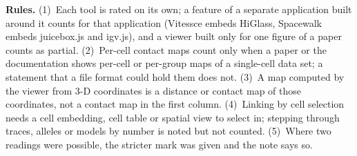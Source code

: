 \medskip\noindent\textbf{Rules.}
(1)~Each tool is rated on its own; a feature of a separate application built around it counts for that application (Vitessce embeds HiGlass, Spacewalk embeds juicebox.js and igv.js), and a viewer built only for one figure of a paper counts as partial.
(2)~Per-cell contact maps count only when a paper or the documentation shows per-cell or per-group maps of a single-cell data set; a statement that a file format could hold them does not.
(3)~A map computed by the viewer from 3-D coordinates is a distance or contact map of those coordinates, not a contact map in the first column.
(4)~Linking by cell selection needs a cell embedding, cell table or spatial view to select in; stepping through traces, alleles or models by number is noted but not counted.
(5)~Where two readings were possible, the stricter mark was given and the note says so.

